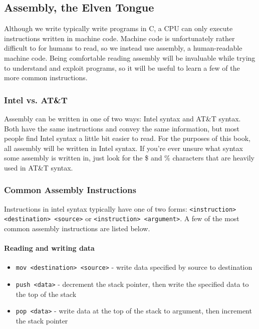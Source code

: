 \documentclass{article}
\begin{document}
\subsection{Assembly, the Elven Tongue}
Although we write typically write programs in C, a CPU can only execute
instructions written in machine code. Machine code is unfortunately rather
difficult to for humans to read, so we instead use assembly, a human-readable
machine code. Being comfortable reading assembly will be invaluable while trying
to understand and exploit programs, so it will be useful to learn a few of the
more common instructions.

\subsubsection{Intel vs. AT\&T}
Assembly can be written in one of two ways: Intel syntax and AT\&T syntax. Both
have the same instructions and convey the same information, but most people find
Intel syntax a little bit easier to read. For the purposes of this book, all
assembly will be written in Intel syntax. If you're ever unsure what syntax some
assembly is written in, just look for the \$ and \% characters that are heavily
used in AT\&T syntax.

\subsubsection{Common Assembly Instructions}
Instructions in intel syntax typically have one of two forms:
\texttt{<instruction> <destination> <source>} or \texttt{<instruction>
<argument>}. A few of the most common assembly instructions are listed below.

\paragraph{Reading and writing data}
\begin{itemize}
    \item \texttt{mov <destination> <source>} - write data specified by source
        to destination
    \item \texttt{push <data>} - decrement the stack pointer, then write the
        specified data to the top of the stack
    \item \texttt{pop <data>} - write data at the top of the stack to argument,
        then increment the stack pointer
\end{itemize}
\end{document}
